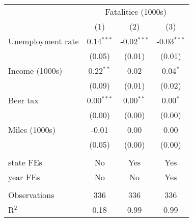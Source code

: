 \begingroup
\centering
\begin{tabular}{lccc}
   \toprule
    & \multicolumn{3}{c}{Fatalities (1000s)}\\
                     & (1)          & (2)           & (3)\\  
   \midrule 
   Unemployment rate & 0.14$^{***}$ & -0.02$^{***}$ & -0.03$^{***}$\\   
                     & (0.05)       & (0.01)        & (0.01)\\   
   Income (1000s)    & 0.22$^{**}$  & 0.02          & 0.04$^{*}$\\   
                     & (0.09)       & (0.01)        & (0.02)\\   
   Beer tax          & 0.00$^{***}$ & 0.00$^{**}$   & 0.00$^{*}$\\   
                     & (0.00)       & (0.00)        & (0.00)\\   
   Miles (1000s)     & -0.01        & 0.00          & 0.00\\   
                     & (0.05)       & (0.00)        & (0.00)\\   
    \\
   state FEs         & No           & Yes           & Yes\\  
   year FEs          & No           & No            & Yes\\  
    \\
   Observations      & 336          & 336           & 336\\  
   R$^2$             & 0.18         & 0.99          & 0.99\\  
   \bottomrule
\end{tabular}
\par\endgroup
